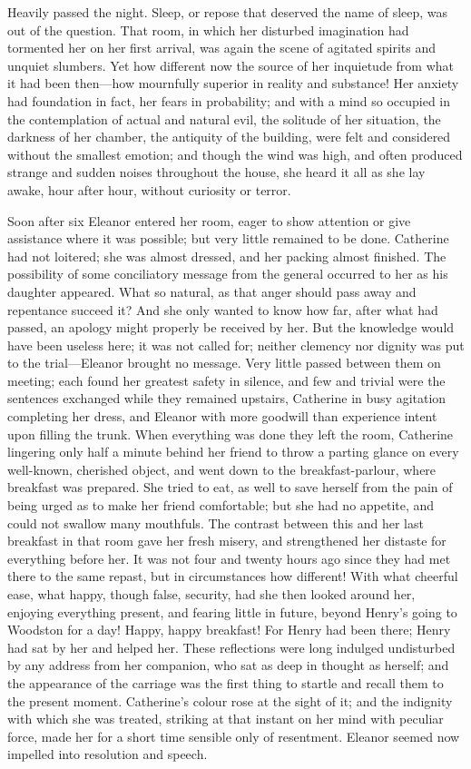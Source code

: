  Heavily passed the night. Sleep, or repose that deserved the name of sleep, was out of the question. That room, in which her disturbed imagination had tormented her on her first arrival, was again the scene of agitated spirits and unquiet slumbers. Yet how different now the source of her inquietude from what it had been then—how mournfully superior in reality and substance! Her anxiety had foundation in fact, her fears in probability; and with a mind so occupied in the contemplation of actual and natural evil, the solitude of her situation, the darkness of her chamber, the antiquity of the building, were felt and considered without the smallest emotion; and though the wind was high, and often produced strange and sudden noises throughout the house, she heard it all as she lay awake, hour after hour, without curiosity or terror. 

 Soon after six Eleanor entered her room, eager to show attention or give assistance where it was possible; but very little remained to be done. Catherine had not loitered; she was almost dressed, and her packing almost finished. The possibility of some conciliatory message from the general occurred to her as his daughter appeared. What so natural, as that anger should pass away and repentance succeed it? And she only wanted to know how far, after what had passed, an apology might properly be received by her. But the knowledge would have been useless here; it was not called for; neither clemency nor dignity was put to the trial—Eleanor brought no message. Very little passed between them on meeting; each found her greatest safety in silence, and few and trivial were the sentences exchanged while they remained upstairs, Catherine in busy agitation completing her dress, and Eleanor with more goodwill than experience intent upon filling the trunk. When everything was done they left the room, Catherine lingering only half a minute behind her friend to throw a parting glance on every well-known, cherished object, and went down to the breakfast-parlour, where breakfast was prepared. She tried to eat, as well to save herself from the pain of being urged as to make her friend comfortable; but she had no appetite, and could not swallow many mouthfuls. The contrast between this and her last breakfast in that room gave her fresh misery, and strengthened her distaste for everything before her. It was not four and twenty hours ago since they had met there to the same repast, but in circumstances how different! With what cheerful ease, what happy, though false, security, had she then looked around her, enjoying everything present, and fearing little in future, beyond Henry's going to Woodston for a day! Happy, happy breakfast! For Henry had been there; Henry had sat by her and helped her. These reflections were long indulged undisturbed by any address from her companion, who sat as deep in thought as herself; and the appearance of the carriage was the first thing to startle and recall them to the present moment. Catherine's colour rose at the sight of it; and the indignity with which she was treated, striking at that instant on her mind with peculiar force, made her for a short time sensible only of resentment. Eleanor seemed now impelled into resolution and speech. 

